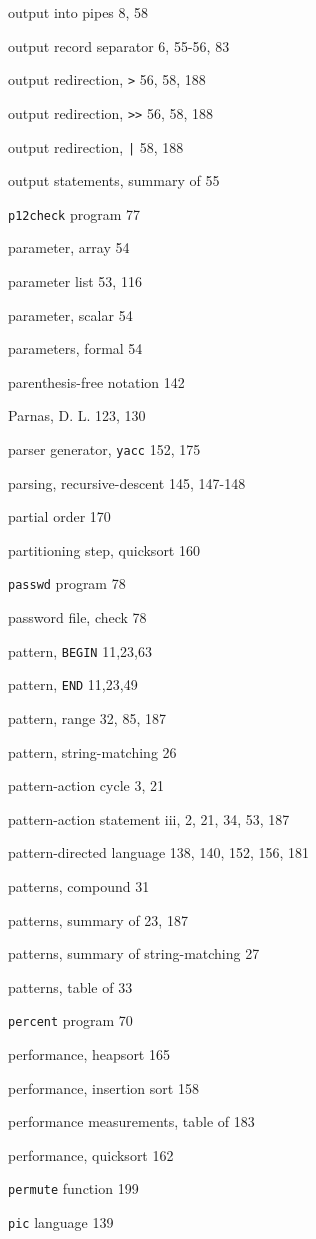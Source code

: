 \begin{multicols}{3}
output into pipes 8, 58

output record separator 6, 55-56,  83

output redirection, \verb'>' 56, 58, 188

output redirection, \verb'>>' 56, 58, 188

output redirection, \verb'|' 58, 188

output statements, summary of 55

\verb'p12check' program 77

parameter, array 54

parameter list 53, 116

parameter, scalar 54

parameters, formal 54

parenthesis-free notation 142

Parnas, D. L. 123, 130

parser generator, \verb'yacc' 152, 175

parsing, recursive-descent 145, 147-148

partial order 170

partitioning step, quicksort 160

\verb'passwd' program 78

password file, check 78

pattern, \verb'BEGIN' 11,23,63

pattern, \verb'END' 11,23,49

pattern, range 32, 85, 187

pattern, string-matching 26

pattern-action cycle 3, 21

pattern-action statement iii, 2, 21, 34, 53, 187

pattern-directed language 138,  140, 152, 156, 181

patterns, compound 31

patterns, summary of 23, 187

patterns, summary of string-matching 27

patterns, table of 33

\verb'percent' program 70

performance, heapsort 165

performance, insertion sort 158

performance measurements, table of 183

performance, quicksort 162

\verb'permute' function 199

\verb'pic' language 139


\end{multicols}
